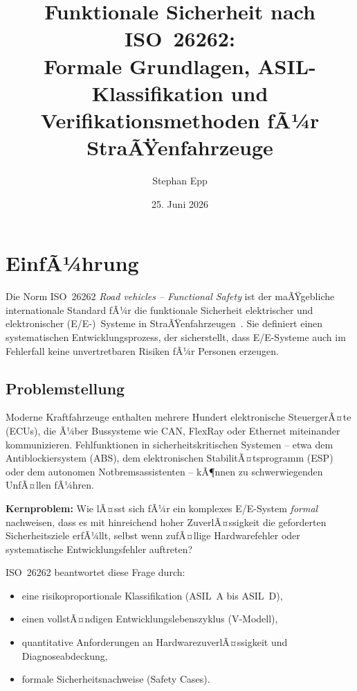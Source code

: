 ﻿\documentclass[a4paper,12pt]{article}
\title{Funktionale Sicherheit nach ISO~26262:\\
Formale Grundlagen, ASIL-Klassifikation und\\
Verifikationsmethoden fÃ¼r StraÃŸenfahrzeuge}
\author{Stephan Epp}
\date{25. Juni 2026}
\theoremstyle{definition}
\begin{document}
\maketitle

\tableofcontents
\newpage

\section{EinfÃ¼hrung}

Die Norm ISO~26262 \emph{Road vehicles -- Functional Safety} ist der maÃŸgebliche
internationale Standard fÃ¼r die funktionale Sicherheit elektrischer und
elektronischer (E/E-)~Systeme in StraÃŸenfahrzeugen~\cite{iso26262_2018}.
Sie definiert einen systematischen Entwicklungsprozess, der sicherstellt,
dass E/E-Systeme auch im Fehlerfall keine unvertretbaren Risiken fÃ¼r Personen
erzeugen.

\subsection{Problemstellung}

Moderne Kraftfahrzeuge enthalten mehrere Hundert elektronische SteuergerÃ¤te
(ECUs), die Ã¼ber Bussysteme wie CAN, FlexRay oder Ethernet miteinander
kommunizieren. Fehlfunktionen in sicherheitskritischen Systemen -- etwa dem
Antiblockiersystem (ABS), dem elektronischen StabilitÃ¤tsprogramm (ESP) oder
dem autonomen Notbremsassistenten -- kÃ¶nnen zu schwerwiegenden UnfÃ¤llen fÃ¼hren.

\textbf{Kernproblem:} Wie lÃ¤sst sich fÃ¼r ein komplexes E/E-System
\emph{formal} nachweisen, dass es mit hinreichend hoher ZuverlÃ¤ssigkeit
die geforderten Sicherheitsziele erfÃ¼llt, selbst wenn zufÃ¤llige Hardware\-fehler
oder systematische Entwicklungsfehler auftreten?

ISO~26262 beantwortet diese Frage durch:
\begin{itemize}
  \item eine risikoproportionale Klassifikation (ASIL~A bis ASIL~D),
  \item einen vollstÃ¤ndigen Entwicklungslebenszyklus (V-Modell),
  \item quantitative Anforderungen an HardwarezuverlÃ¤ssigkeit und
        Diagnoseabdeckung,
  \item formale Sicherheitsnachweise (Safety Cases).
\end{itemize}
\end{document}
